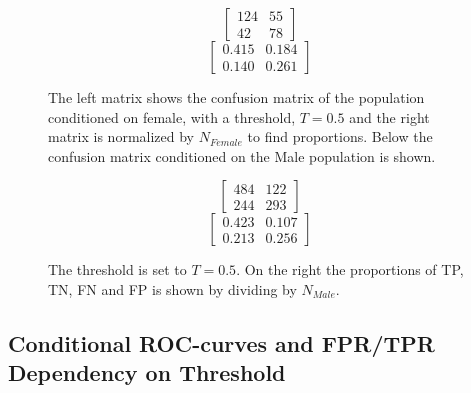 \documentclass[11pt, fleqn, titlepage]{article}
\begin{document}
	
		\begin{figure}[h]	
		\begin{multicols}{2}
			\begin{ceqn}
				\begin{equation*}
				\begin{bmatrix}
				124 & 55  \\
				42 & 78 
				\end{bmatrix} 
				\end{equation*} 
				\begin{equation*}
				\begin{bmatrix}
				0.415 & 0.184  \\
				0.140 & 0.261 
				\end{bmatrix} 
				\end{equation*}
			\end{ceqn}
		\end{multicols}
		{The left matrix shows the confusion matrix of the population conditioned on female, with a threshold, $ T = 0.5 $ and the right matrix is normalized by $N_{Female}$ to find proportions. Below the confusion matrix conditioned on the Male population is shown.}
	\end{figure}
	\begin{figure}[h]	
		\begin{multicols}{2}
			\begin{ceqn}
				\begin{equation*}
				\begin{bmatrix}
				484 & 122  \\
				244 & 293 
				\end{bmatrix} 
				\end{equation*} 
				\begin{equation*}
				\begin{bmatrix}
				0.423 & 0.107 \\
				0.213 & 0.256 
				\end{bmatrix} 
				\end{equation*}
			\end{ceqn}
		\end{multicols}
		{The threshold is set to $T = 0.5$. On the right the proportions of TP, TN, FN and FP is shown by dividing by $N_{Male}$.}
	\end{figure}
	
	
	\subsection{Conditional ROC-curves and FPR/TPR Dependency on Threshold}\label{ROC}
	
\end{document}
